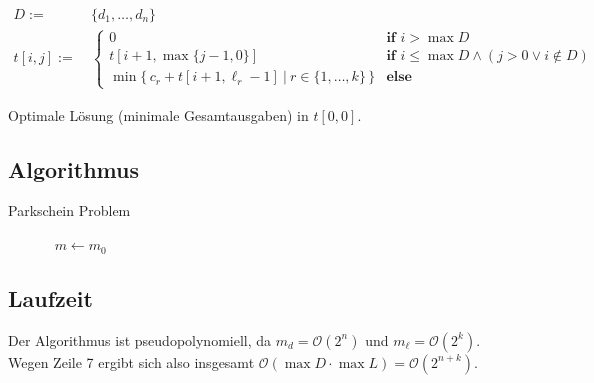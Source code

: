 \begin{align*}
	D := &\ \{ d_1, \dots, d_n \} \\
	t[i, j] := &\ \begin{cases}
		0 & \textbf{if } i > \max D \\
		t[i + 1, \max \{ j - 1, 0 \}] & \textbf{if } i \le \max D \land (j > 0 \lor i \notin D) \\
		\min \{ \, c_{r} + t[i + 1, \ell_{r} - 1]\ |\ r \in \{ 1, \dots, k \} \, \} & \textbf{else}
	\end{cases}
\end{align*}

Optimale Lösung (minimale Gesamtausgaben) in $t[0, 0]$.

\subsection{Algorithmus}
\label{sub:Algorithmus}

\begin{algorithm}
	\caption{Parkschein Problem}
	\begin{algorithmic}[1]
		\Statex\
			 
			\State{$m_\ell \gets \max L$} 
			\Statex\
			 
			\EndFor\
			\For{$i \gets m_d \ato 0$} 
				 
				\EndFor\
				\If{$i \in D$} 
					\State{$m \gets \infty$}
					\For{$r \gets 1 \ato k$} 
						\If{$m_0 < m$}
							$m \gets m_0$
						\EndIf\
					\EndFor\
				\Else\
				\EndIf\
			\EndFor\
			\Statex\
		\EndFunction{}
	\end{algorithmic}
\end{algorithm}

\subsection{Laufzeit}
\label{sub:Laufzeit}

Der Algorithmus ist pseudopolynomiell, da $m_d = \mathcal{O}(2^n)$ und $m_\ell = \mathcal{O}(2^k)$. \\
Wegen Zeile 7 ergibt sich also insgesamt $\mathcal{O}(\max D \cdot \max L) = \mathcal{O}(2^{n + k})$.


